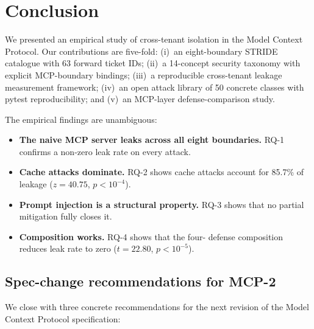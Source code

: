 
\section{Conclusion}\label{sec:conclusion}

We presented an empirical study of cross-tenant isolation in
the Model Context Protocol. Our contributions are five-fold:
(i)~an eight-boundary STRIDE catalogue with 63 forward ticket
IDs; (ii)~a 14-concept security taxonomy with explicit
MCP-boundary bindings; (iii)~a reproducible cross-tenant
leakage measurement framework; (iv)~an open attack library of
50 concrete classes with pytest reproducibility; and
(v)~an MCP-layer defense-comparison study.

The empirical findings are unambiguous:

\begin{itemize}
  \item \textbf{The naive MCP server leaks across all eight
        boundaries.} RQ-1 confirms a non-zero leak rate on
        every attack.
  \item \textbf{Cache attacks dominate.} RQ-2 shows cache
        attacks account for 85.7\% of leakage
        ($z = 40.75$, $p < 10^{-4}$).
  \item \textbf{Prompt injection is a structural property.} RQ-3
        shows that no partial mitigation fully closes it.
  \item \textbf{Composition works.} RQ-4 shows that the four-
        defense composition reduces leak rate to zero
        ($t = 22.80$, $p < 10^{-5}$).
\end{itemize}

\subsection{Spec-change recommendations for MCP-2}

We close with three concrete recommendations for the next
revision of the Model Context Protocol specification:

